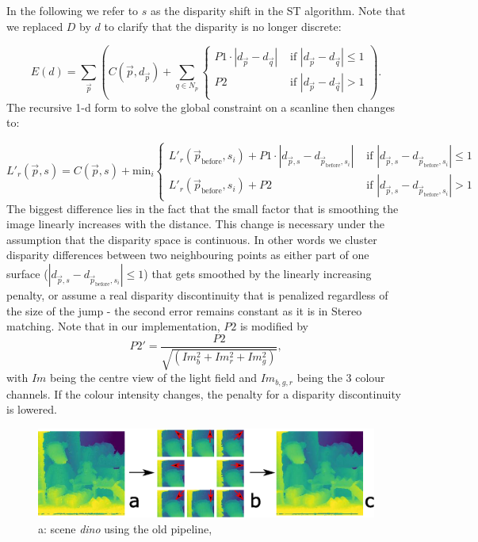 \documentclass  [
  paper    = a4,
  BCOR     = 10mm,
  twoside,
  fontsize = 12pt,
  fleqn,
  toc      = bibnumbered,
  toc      = listofnumbered,
  numbers  = noendperiod,
  headings = normal,
  listof   = leveldown,
  version  = 3.03
]                                       {scrreprt}
\begin{document}
 In the following we refer to $s$ as the disparity shift in the ST algorithm. Note that we replaced $D$ by $d$ to clarify that the disparity is no longer discrete:

\begin{equation}\label{eq:global_sgm_cont}
E(d) = \sum_{\vec p} \left(C(\vec{p}, d_{\vec p}) + \sum_{q\in N_p} 
\begin{cases}
P1\cdot |d_{\vec p} - d_{\vec q}|  & \text{ if }|d_{\vec p} - d_{\vec q}| \leq 1\\
P2 & \text{ if }|d_{\vec p} - d_{\vec q}| > 1\\
\end{cases}  
\right).
\end{equation}
The recursive 1-d form to solve the global constraint on a scanline then changes to:

\begin{equation}\label{eq:recursive1d}
L'_r(\vec{p}, s) = C(\vec{p}, s) + \text{min}_i
\begin{cases}
L'_r(\vec{p}_\text{before}, s_i)+P1 \cdot |d_{\vec p, s} - d_{\vec{p}_\text{before}, s_i}|  & \text{ if }|d_{\vec p, s} - d_{\vec{p}_\text{before}, s_i}| \leq 1 \\
L'_r(\vec{p}_\text{before}, s_i)+P2 & \text{ if }|d_{\vec p, s} - d_{\vec{p}_\text{before}, s_i}| > 1
\end{cases}
\end{equation} 
The biggest difference lies in the fact that the small factor that is smoothing the image linearly increases with the distance. This change is necessary under the assumption that the disparity space is continuous. In other words we cluster disparity differences between two neighbouring points as either part of one surface ($|d_{\vec p, s} - d_{\vec{p}_\text{before}, s_i}| \leq 1$) that gets smoothed by the linearly increasing penalty, or assume a real disparity discontinuity that is penalized regardless of the size of the jump - the second error remains constant as it is in Stereo matching. Note that in our implementation, $P2$ is modified by 
\begin{equation}\label{eq:gradientp2}
P2' =  \frac{P2}{\sqrt{(Im_b^2 +Im_r^2 + Im_g^2)}},
\end{equation}
with $Im$ being the centre view of the light field and $Im_{b,g,r}$ being the 3 colour channels. If the colour intensity changes, the penalty for a disparity discontinuity is lowered.

\begin{figure}
	\centering
	\includegraphics[width=1\linewidth]{images/subplot_sgm}
	\caption[SGM from different directions]{a: scene \textit{dino} using the old pipeline,}
	\label{fig:subplotsgm}
\end{figure}
\end{document}
